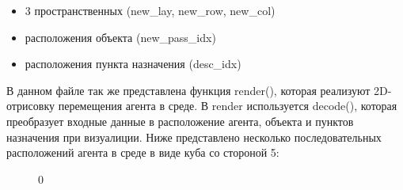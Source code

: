 \documentclass[12pt, a4paper]{report}
\theoremstyle{definition}
\theoremstyle{plain}
\theoremstyle{remark}
\theoremstyle{remark}
\theoremstyle{definition}
\begin{document}
\begin{itemize}
    \item 3 пространственных (new\_lay, new\_row, new\_col)
    \item расположения объекта (new\_pass\_idx)
    \item расположения пункта назначения (desc\_idx)
\end{itemize}
В данном файле так же представлена функция render(), которая реализуют 2D-отрисовку перемещения агента в среде. В render используется decode(), которая преобразует входные данные в расположение агента, объекта и пунктов назначения при визуалиции. Ниже представлено несколько последовательных расположений агента в среде в виде куба со стороной 5:
\begin{figure}[h!]
    \begin{minipage}[h!]{0.24\linewidth}
         0\\
    \end{minipage}
    \begin{minipage}[h!]{0.24\linewidth}

\end{minipage}
\end{figure}
\end{document}

